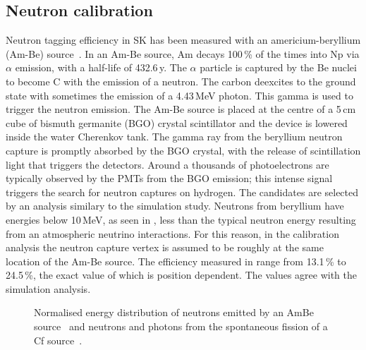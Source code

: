 \subsection{Neutron calibration}


Neutron tagging efficiency in SK has been measured with an americium-beryllium (Am-Be) source~\cite{Watanabe:2008ru}.
In an Am-Be source, Am decays 100\,\% of the times into Np via $\alpha$ emission, %
with a half-life of 432.6\,y.
The $\alpha$ particle is captured by the Be nuclei to become C\tapi{*} with the emission of a neutron.
The carbon deexcites to the ground state with sometimes the emission of a 4.43\,MeV photon.
This gamma is used to trigger the neutron emission.
The Am-Be source is placed at the centre of a 5\,cm cube of bismuth germanite (BGO) crystal scintillator and %
the device is lowered inside the water Cherenkov tank.
The gamma ray from the beryllium neutron capture is promptly absorbed by the BGO crystal, %
with the release of scintillation light that triggers the detectors. 
Around a thousands of photoelectrons are typically observed by the PMTs from the BGO emission; %
this intense signal triggers the search for neutron captures on hydrogen.
The candidates are selected by an analysis similary to the simulation study.
Neutrons from beryllium have energies below 10\,MeV, as seen in , %
less than the typical neutron energy resulting from an atmospheric neutrino interactions.
For this reason, in the calibration analysis the neutron capture vertex is assumed to be roughly at the same location %
of the Am-Be source.
The efficiency measured in  range from 13.1\,\% to 24.5\,\%, %
the exact value of which is position dependent.
The values agree with the simulation analysis.

\begin{figure}
	\begin{minipage}[t]{0.48\textwidth}
		\centering
		\resizebox{\textwidth}{!}{}
		\caption{Normalised energy distribution of neutrons emitted by an AmBe source~\cite{PMID:4744412} %
			and neutrons and photons from the spontaneous fission of a %
			Cf source~\cite{PhysRev.104.699, PhysRev.108.411}.}
		\label{fig:spectra}
	\end{minipage}
	\hfill
	\begin{minipage}[t]{0.48\textwidth}
		\centering
		\resizebox{\textwidth}{!}{}
		\label{fig:QE}
	\end{minipage}
\end{figure}

